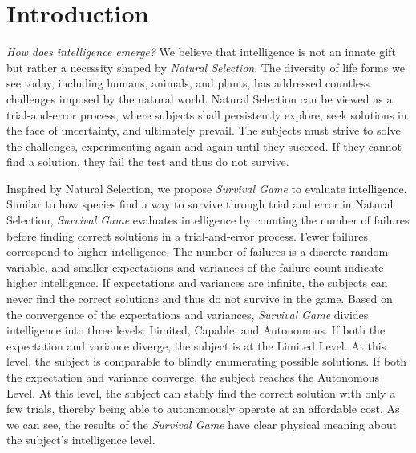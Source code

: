 \section{Introduction}
    


\textit{How does intelligence emerge?} We believe that intelligence is not an innate gift but rather a necessity shaped by \textit{Natural Selection}. The diversity of life forms we see today, including humans, animals, and plants, has addressed countless challenges imposed by the natural world.
Natural Selection can be viewed as a trial-and-error process, where subjects shall persistently explore, seek solutions in the face of uncertainty, and ultimately prevail.  
The subjects must strive to solve the challenges, experimenting again and again until they succeed. If they cannot find a solution, they fail the test and thus do not survive. 


Inspired by Natural Selection, we propose \textit{Survival Game} to evaluate intelligence. Similar to how species find a way to survive through trial and error in Natural Selection, \textit{Survival Game} evaluates intelligence by counting the number of failures before finding correct solutions in a trial-and-error process. Fewer failures correspond to higher intelligence. The number of failures is a discrete random variable, and smaller expectations and variances of the failure count indicate higher intelligence.
If expectations and variances are infinite, the subjects can never find the correct solutions and thus do not survive in the game.
Based on the convergence of the expectations and variances, \textit{Survival Game} divides intelligence into three levels: Limited, Capable, and Autonomous. If both the expectation and variance diverge, the subject is at the Limited Level. At this level, the subject is comparable to blindly enumerating possible solutions. If both the expectation and variance converge, the subject reaches the Autonomous Level. At this level, the subject can stably find the correct solution with only a few trials, thereby being able to autonomously operate at an affordable cost.
As we can see, the results of the \textit{Survival Game} have clear physical meaning about the subject's intelligence level.


